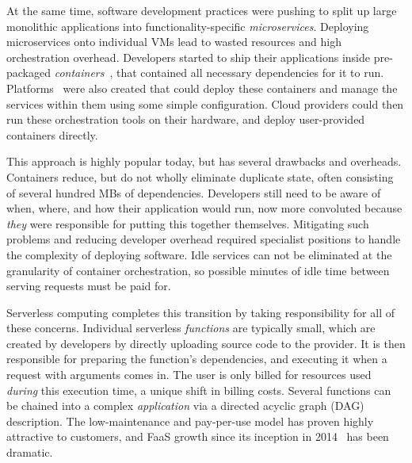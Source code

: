 At the same time, software development practices were pushing to split up large monolithic applications into functionality-specific \emph{microservices}.
Deploying microservices onto individual VMs lead to wasted resources and high orchestration overhead.
Developers started to ship their applications inside pre-packaged \emph{containers}~\cite{docker-main}, that contained all necessary dependencies for it to run.
Platforms~\cite{kubernetes} were also created that could deploy these containers and manage the services within them using some simple configuration.
Cloud providers could then run these orchestration tools on their hardware, and deploy user-provided containers directly.

This approach is highly popular today, but has several drawbacks and overheads.
Containers reduce, but do not wholly eliminate duplicate state, often consisting of several hundred MBs of dependencies.
Developers still need to be aware of when, where, and how their application would run, now more convoluted because \emph{they} were responsible for putting this together themselves.
Mitigating such problems and reducing developer overhead required specialist  positions to handle the complexity of deploying software. 
Idle services can not be eliminated at the granularity of container orchestration, so possible minutes of idle time between serving requests must be paid for.


Serverless computing completes this transition by taking responsibility for all of these concerns.
Individual serverless \emph{functions} are typically small, which are created by developers by directly uploading source code to the provider.
It is then responsible for preparing the function's dependencies, and executing it when a request with arguments comes in.
The user is only billed for resources used \emph{during} this execution time, a unique shift in billing costs.
Several functions can be chained into a complex \emph{application} via a directed acyclic graph (DAG) description.
The low-maintenance and pay-per-use model has proven highly attractive to customers, and FaaS growth since its inception in 2014~\cite{lambda} has been dramatic.

